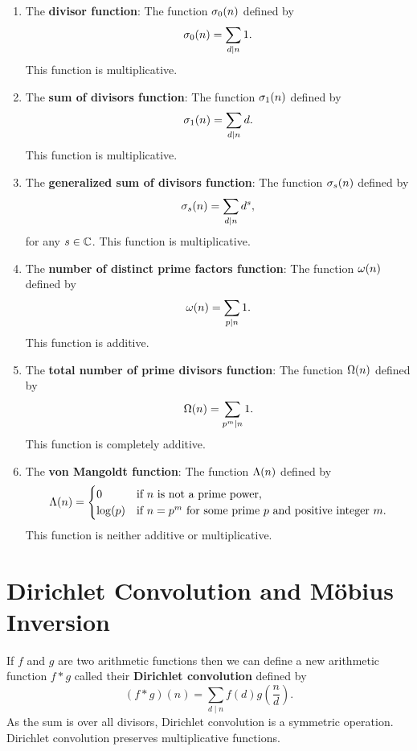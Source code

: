 \begin{enumerate}[label*=(\roman*)]
\[      \]
      This function is multiplicative.
      \item The \textbf{divisor function}: The function \(\sigma_{0}(n)\) defined by
      \[
        \sigma_{0}(n) = \sum_{d \mid n}1.
      \]
      This function is multiplicative.
      \item The \textbf{sum of divisors function}: The function \(\sigma_{1}(n)\) defined by
      \[
        \sigma_{1}(n) = \sum_{d \mid n}d.
      \]
      This function is multiplicative.
      \item The \textbf{generalized sum of divisors function}: The function \(\sigma_{s}(n)\) defined by
      \[
        \sigma_{s}(n) = \sum_{d \mid n}d^{s},
      \]
      for any \(s \in \mathbb{C}\). This function is multiplicative.
      \item The \textbf{number of distinct prime factors function}: The function \(\omega(n)\) defined by
      \[
        \omega(n) = \sum_{p \mid n}1.
      \]
      This function is additive.
      \item The \textbf{total number of prime divisors function}: The function \(\Omega(n)\) defined by
      \[
        \Omega(n) = \sum_{p ^{m} \mid n}1.
      \]
      This function is completely additive.
      \item The \textbf{von Mangoldt function}: The function \(\Lambda(n)\) defined by
      \[
        \Lambda(n) = \begin{cases} 0 & \text{if \(n\) is not a prime power}, \\ \log(p) & \text{if \(n = p^{m}\) for some prime \(p\) and positive integer \(m\)}. \end{cases}
      \]
      This function is neither additive or multiplicative.
    \end{enumerate}
  \section{Dirichlet Convolution and M\"obius Inversion}
    If \(f\) and \(g\) are two arithmetic functions then we can define a new arithmetic function \(f \ast g\) called their \textbf{Dirichlet convolution} defined by
    \[
      (f \ast g)(n) = \sum_{d \mid n}f(d)g\left(\frac{n}{d}\right).
    \]
    As the sum is over all divisors, Dirichlet convolution is a symmetric operation. Dirichlet convolution preserves multiplicative functions.

